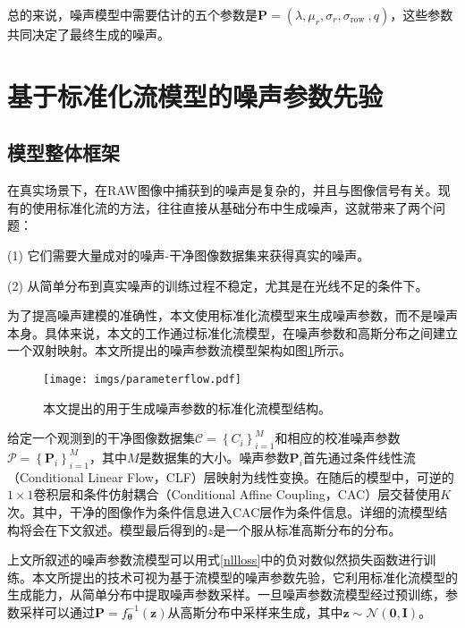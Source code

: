 总的来说，噪声模型中需要估计的五个参数是$\boldsymbol{P}=\left(\lambda, \mu_r, \sigma_r, \sigma_{\text {row }}, q\right)$，这些参数共同决定了最终生成的噪声。


\section{基于标准化流模型的噪声参数先验}

\subsection{模型整体框架}

在真实场景下，在RAW图像中捕获到的噪声是复杂的，并且与图像信号有关。现有的使用标准化流的方法\cite{noiseflow, srgbflow}，往往直接从基础分布中生成噪声，这就带来了两个问题：

(1) 它们需要大量成对的噪声-干净图像数据集来获得真实的噪声。

(2) 从简单分布到真实噪声的训练过程不稳定，尤其是在光线不足的条件下\cite{srgbflow,ftd}。

为了提高噪声建模的准确性，本文使用标准化流模型来生成噪声参数，而不是噪声本身。具体来说，本文的工作通过标准化流模型，在噪声参数和高斯分布之间建立一个双射映射。本文所提出的噪声参数流模型架构如图\ref{fig:parameterflow}所示。

\begin{figure}[h]
	\centering
	\texttt{[image: imgs/parameterflow.pdf]}
	\caption{本文提出的用于生成噪声参数的标准化流模型结构。}
	\label{fig:parameterflow}
\end{figure}

给定一个观测到的干净图像数据集$\mathcal{C}=\left\{C_i\right\}_{i=1}^M$和相应的校准噪声参数$\mathcal{P}=\left\{\boldsymbol{P}_i\right\}_{i=1}^M$，其中$M$是数据集的大小。噪声参数$\boldsymbol{P}_i$首先通过条件线性流（Conditional Linear Flow，CLF）层映射为线性变换。在随后的模型中，可逆的$1\times1$卷积层和条件仿射耦合（Conditional Affine Coupling，CAC）层交替使用$K$次。其中，干净的图像作为条件信息进入CAC层作为条件信息。详细的流模型结构将会在下文叙述。模型最后得到的$z$是一个服从标准高斯分布的分布。

上文所叙述的噪声参数流模型可以用式\ref{nllloss}中的负对数似然损失函数进行训练。本文所提出的技术可视为基于流模型的噪声参数先验，它利用标准化流模型的生成能力，从简单分布中提取噪声参数采样。一旦噪声参数流模型经过预训练，参数采样可以通过$\boldsymbol{P}=f_{\boldsymbol{\theta}}^{-1}(\boldsymbol{z})$从高斯分布中采样来生成，其中$\boldsymbol{z} \sim \mathcal{N}(\mathbf{0}, \mathbf{I})$。

